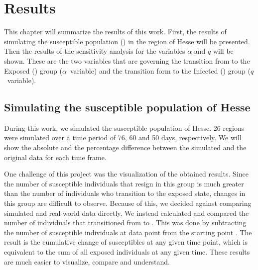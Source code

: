 
\chapter{Results} %

\label{chap:results} 
This chapter will summarize the results of this work. First, the results of simulating the susceptible population ()
in the region of Hesse will be presented. Then the results of the sensitivity analysis for the variables $\alpha$ and
$q$ will be shown. These are the two variables that are governing the transition from  to
the Exposed () group ($\alpha$~variable) and the transition form  to the Infected () group ($q$~variable).



\section{Simulating the susceptible population of Hesse}
\label{sec:sim_res}
During this work, we simulated the susceptible population of Hesse. 26 regions were simulated over a time period of
76, 60 and 50 days, respectively. We will show the absolute and the percentage difference between the simulated
and the original data for each time frame.\newline

One challenge of this project was the visualization of the obtained results. Since the number of susceptible
individuals that resign in this group is much greater than the number of individuals who transition to the exposed state,
changes in this group are difficult to observe. Because of this, we decided against comparing simulated and real-world
 data directly. We instead  calculated and compared the number of individuals that
transitioned from  to . This was done by subtracting the number of susceptible individuals at data point  from
the starting point . The result is the cumulative change of susceptibles at any given time point, which is equivalent to the 
sum of all exposed individuals at any given time. These results are much easier to visualize, compare and understand.

